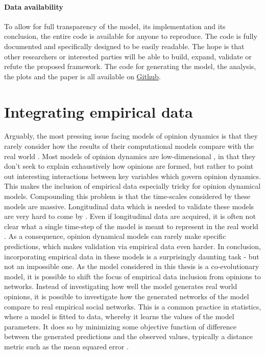 \documentclass[11pt]{article}
\begin{document}
\subsection{Data availability}
To allow for full transparency of the model, its implementation and its conclusion, the entire code is available for anyone to reproduce. The code is fully documented and specifically designed to be easily readable.
The hope is that other researchers or interested parties will be able to build, expand, validate or refute the proposed framework. The code for generating the model, the analysis, the plots and the paper is all available on  \href{https://github.com/Gotticketsto360tour/LaDoN}{Github}.

\part{Integrating empirical data}
Arguably, the most pressing issue facing models of opinion dynamics is that they rarely consider how the results of their computational models compare with the real world \cite{flache_between_2018}. Most models of opinion dynamics are low-dimensional \cite{bener_empirical_2016}, in that they don’t seek to explain exhaustively how opinions are formed, but rather to point out interesting interactions between key variables which govern opinion dynamics. This makes the inclusion of empirical data especially tricky for opinion dynamical models. Compounding this problem is that the time-scales considered by these models are massive. Longitudinal data which is needed to validate these models are very hard to come by \cite{mas2019challenges, kossinets_origins_2009}. Even if longitudinal data are acquired, it is often not clear what a single time-step of the model is meant to represent in the real world \cite{mas2019challenges}. As a consequence, opinion dynamical models can rarely make specific predictions, which makes validation via empirical data even harder. In conclusion, incorporating empirical data in these models is a surprisingly daunting task - but not an impossible one. As the model considered in this thesis is a co-evolutionary model, it is possible to shift the focus of empirical data inclusion from opinions to networks. Instead of investigating how well the model generates real world opinions, it is possible to investigate how the generated networks of the model compare to real empirical social networks. This is a common practice in statistics, where a model is fitted to data, whereby it learns the values of the model parameters. It does so by minimizing some objective function of difference between the generated predictions and the observed values, typically a distance metric such as the mean squared error \cite{akiba_optuna_2019}. 
\end{document}

